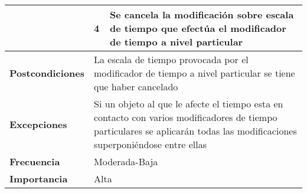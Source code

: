 \begin{longtable}{lll}
\multicolumn{1}{l|}{}                            & 4                                                      & Se cancela la modificación sobre escala de tiempo que efectúa el modificador de tiempo a nivel particular                                             \\ \hline
\textbf{Postcondiciones}                         & \multicolumn{2}{l}{La escala de tiempo provocada por el modificador de tiempo a nivel particular se tiene que haber cancelado}                                                                                 \\ \hline
\textbf{Excepciones}                             & \multicolumn{2}{l}{Si un objeto al que le afecte el tiempo esta en contacto con varios modificadores de tiempo particulares se aplicarán todas las modificaciones superponiéndose entre ellas}                 \\ \hline
\textbf{Frecuencia}                              & \multicolumn{2}{l}{Moderada-Baja}                                                                                                                                                                              \\ \hline
\textbf{Importancia}                             & \multicolumn{2}{l}{Alta}                                                                                                                                                                                       \\ \hline
\end{longtable}